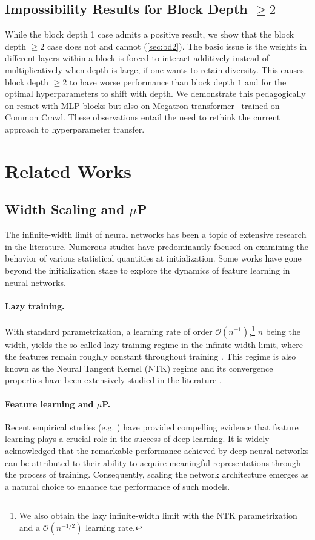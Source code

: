 \documentclass{article}
\theoremstyle{plain}
\theoremstyle{definition}
\begin{document}
\subsection{Impossibility Results for Block Depth $\ge 2$}

While the block depth 1 case admits a positive result, we show that the block depth $\ge 2$ case does not and cannot (\cref{sec:bd2}). The basic issue is the weights in different layers within a block is forced to interact additively instead of multiplicatively when depth is large, if one wants to retain diversity.
This causes block depth $\ge 2$ to have worse performance than block depth $1$ and for the optimal hyperparameters to shift with depth.
We demonstrate this pedagogically on resnet with MLP blocks but also on Megatron transformer~\citep{shoeybi2019megatron} trained on Common Crawl.
These observations entail the need to rethink the current approach to hyperparameter transfer.

 
\section{Related Works}
\subsection{Width Scaling and $\mu$P} The infinite-width limit of neural networks has been a topic of extensive research in the literature. Numerous studies have predominantly focused on examining the behavior of various statistical quantities at initialization. Some works have gone beyond the initialization stage to explore the dynamics of feature learning in neural networks.
\paragraph{Lazy training.} With standard parametrization, a learning rate of order $\mathcal{O}(n^{-1})$,\footnote{We also obtain the lazy infinite-width limit with the NTK parametrization and a $\mathcal{O}(n^{-1/2})$ learning rate.} $n$ being the width, yields the so-called lazy training regime in the infinite-width limit, where the features remain roughly constant throughout training \citep{chizat2020lazy, yang2022tensor}. This regime is also known as the Neural Tangent Kernel (NTK) regime and its convergence properties have been extensively studied in the literature \citep{jacot2020neural, allenzhu2019convergence, chizat2018global, zou2018stochastic}. 

\paragraph{Feature learning and $\mu$P.} Recent empirical studies (e.g. \cite{yang2022tensor}) have provided compelling evidence that feature learning plays a crucial role in the success of deep learning. It is widely acknowledged that the remarkable performance achieved by deep neural networks can be attributed to their ability to acquire meaningful representations through the process of training. Consequently, scaling the network architecture emerges as a natural choice to enhance the performance of such models.
\end{document}
